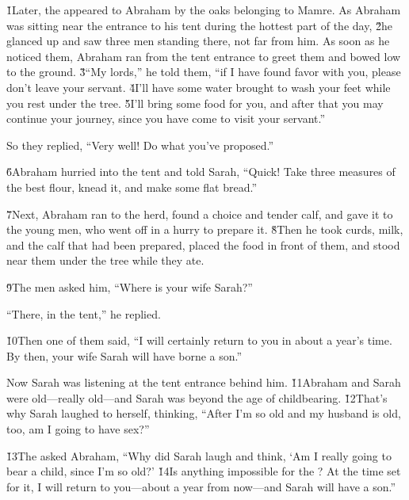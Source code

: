 \v{1}Later, the  appeared to Abraham by the oaks belonging to Mamre. As Abraham was sitting near the entrance to his tent during the hottest part of the day, \v{2}he glanced up and saw three men standing there, not far from him. As soon as he noticed them, Abraham ran from the tent entrance to greet them and bowed low to the ground. \v{3}``My lords,'' he told them, ``if I have found favor with you, please don't leave your servant. \v{4}I'll have some water brought to wash your feet while you rest under the tree. \v{5}I'll bring some food for you, and after that you may continue your journey, since you have come to visit your servant.''

So they replied, ``Very well! Do what you've proposed.''

\v{6}Abraham hurried into the tent and told Sarah, ``Quick! Take three measures of the best flour, knead it, and make some flat bread.''

\v{7}Next, Abraham ran to the herd, found a choice and tender calf, and gave it to the young men, who went off in a hurry to prepare it. \v{8}Then he took curds, milk, and the calf that had been prepared, placed the food in front of them, and stood near them under the tree while they ate.

\v{9}The men asked him, ``Where is your wife Sarah?''

``There, in the tent,'' he replied.

\v{10}Then one of them said, ``I will certainly return to you in about a year's time. By then, your wife Sarah will have borne a son.''

Now Sarah was listening at the tent entrance behind him. \v{11}Abraham and Sarah were old---really old---and Sarah was beyond the age of childbearing. \v{12}That's why Sarah laughed to herself, thinking, ``After I'm so old and my husband is old, too, am I going to have sex?''

\v{13}The  asked Abraham, ``Why did Sarah laugh and think, `Am I really going to bear a child, since I'm so old?' \v{14}Is anything impossible for the ? At the time set for it, I will return to you---about a year from now---and Sarah will have a son.''

